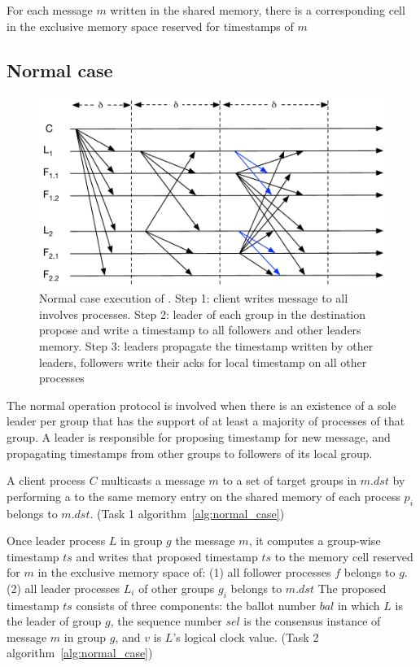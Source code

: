 For each message $m$ written in the shared memory, there is a corresponding cell
in the exclusive memory space reserved for timestamps of $m$

\subsection{Normal case}

\begin{figure}[ht!]
  \centering
  \includegraphics[width=1\linewidth]{figures/timeline-simple}
  \caption{Normal case execution of \proto. Step 1: client writes message to all
          involves processes. Step 2: leader of each group in the destination
          propose and write a timestamp to all followers and other leaders
          memory. Step 3: leaders propagate the timestamp written by other
          leaders, followers write their acks for local timestamp on all other
          processes}
  \label{fig:normal_operation_time}
\end{figure}



The normal operation protocol is involved when there is an existence of a sole
leader per group that has the support of at least a majority of processes of
that group. A leader is responsible for proposing timestamp for new message, and
propagating timestamps from other groups to followers of its local group.

A client process $C$ multicasts a message $m$ to a set of target groups in
$m.dst$ by performing a \rwrite to the same memory entry on the shared memory of
each process $p_i$ belongs to $m.dst$. (Task 1 algorithm~\ref{alg:normal_case})

Once leader process $L$ in group $g$ \lread the message $m$, it computes a
group-wise timestamp $ts$ and writes that proposed timestamp $ts$ to the memory
cell reserved for $m$ in the exclusive memory space of: (1) all follower
processes $f$ belongs to $g$. (2) all leader processes $L_i$ of other groups
$g_i$ belongs to $m.dst$ The proposed timestamp $ts$ consists of three
components: the ballot number $bal$ in which $L$ is the leader of group $g$, the
sequence number $sel$ is the consensus instance of message $m$ in group $g$, and
$v$ is $L$'s logical clock value. (Task 2 algorithm~\ref{alg:normal_case})

